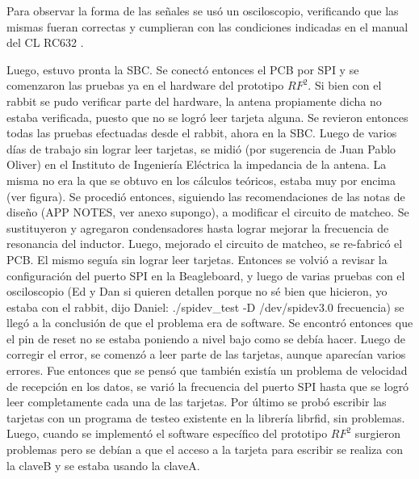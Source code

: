 Para observar la forma de las señales se usó un osciloscopio, verificando que las mismas fueran correctas y cumplieran con las condiciones indicadas en el manual del CL RC632 .

Luego, estuvo pronta la SBC. Se conectó entonces el PCB por SPI y se comenzaron las pruebas ya en el hardware del prototipo ${RF^{2}}$. Si bien con el rabbit se pudo verificar parte del hardware, la antena propiamente dicha no estaba verificada, puesto que no se logró leer tarjeta alguna.
Se revieron entonces todas las pruebas efectuadas desde el rabbit, ahora en la SBC. Luego de varios días de trabajo sin lograr leer tarjetas, se midió (por sugerencia de Juan Pablo Oliver) en el Instituto de Ingeniería Eléctrica la impedancia de la antena. La misma no era la que se obtuvo en los cálculos teóricos, estaba muy por encima (ver figura). Se procedió entonces, siguiendo las recomendaciones de las notas de diseño (APP NOTES, ver anexo supongo), a modificar el circuito de matcheo. Se sustituyeron y agregaron condensadores hasta lograr mejorar la frecuencia de resonancia del inductor.
Luego, mejorado el circuito de matcheo, se re-fabricó el PCB. El mismo seguía sin lograr leer tarjetas. Entonces se volvió a revisar la configuración del puerto SPI en la Beagleboard, y luego de varias pruebas con el osciloscopio (Ed y Dan si quieren detallen porque no sé bien que hicieron, yo estaba con el rabbit, dijo Daniel:  ./spidev\_test -D /dev/spidev3.0 frecuencia) se llegó a la conclusión de que el problema era de software. Se encontró entonces que el pin de reset no se estaba poniendo a nivel bajo como se debía hacer. Luego de corregir el error, se comenzó a leer parte de las tarjetas, aunque aparecían varios errores. Fue entonces que se pensó que también existía un problema de velocidad de recepción en los datos, se varió la frecuencia del puerto SPI hasta que se logró leer completamente cada una de las tarjetas.
Por último se probó escribir las tarjetas con un programa de testeo existente en la librería librfid, sin problemas. Luego, cuando se implementó el software específico del prototipo ${RF^{2}}$ surgieron problemas pero se debían a que el acceso a la tarjeta para escribir se realiza con la claveB y se estaba usando la claveA.